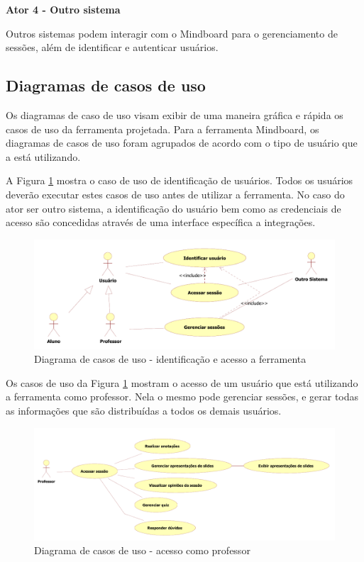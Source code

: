 \textbf{Ator 4 - Outro sistema}

Outros sistemas podem interagir com o Mindboard para o gerenciamento de sessões, além de identificar e autenticar usuários.

\subsection{Diagramas de casos de uso}

Os diagramas de caso de uso visam exibir de uma maneira gráfica e rápida os casos de uso da ferramenta projetada. Para a ferramenta Mindboard, os diagramas de casos de uso foram agrupados de acordo com o tipo de usuário que a está utilizando. 

A Figura \ref{fig:use_case1} mostra o caso de uso de identificação de usuários. Todos os usuários deverão executar estes casos de uso antes de utilizar a ferramenta. No caso do ator ser outro sistema, a identificação do usuário bem como as credenciais de acesso são concedidas através de uma interface específica a integrações.
 
\begin{figure}[!h]
\centering
\includegraphics[width=1.0\textwidth]{pdfs/img-use-case1.pdf} 
\caption{Diagrama de casos de uso - identificação e acesso a ferramenta}
\label{fig:use_case1} 
\end{figure}

Os casos de uso da Figura \ref{fig:use_case1} mostram o acesso de um usuário que está utilizando a ferramenta como professor. Nela o mesmo pode gerenciar sessões, e gerar todas as informações que são distribuídas a todos os demais usuários.

 

\begin{figure}[!h]
\centering
\includegraphics[width=1.0\textwidth]{pdfs/img-use-case2.pdf} 
\caption{Diagrama de casos de uso - acesso como professor}
\label{fig:use_case2} 
\end{figure}

